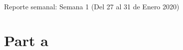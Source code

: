 \documentclass{article}
\begin{document}
Reporte semanal: Semana 1 (Del 27 al 31 de Enero 2020)

\section*{Part a}
\end{document}
